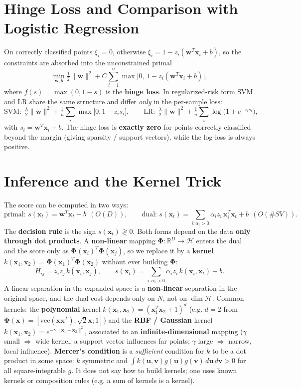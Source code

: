 \section*{Hinge Loss and Comparison with Logistic Regression}

On correctly classified points $\xi_i=0$, otherwise $\xi_i=1-z_i(\mathbf{w}^T\mathbf{x}_i+b)$, so the constraints are absorbed into the unconstrained primal
\[
\min_{\mathbf{w},b}\tfrac12\|\mathbf{w}\|^2+C\sum_{i=1}^n\max\!\big[0,\,1-z_i(\mathbf{w}^T\mathbf{x}_i+b)\big],
\]
where $f(s)=\max(0,1-s)$ is the \textbf{hinge loss}. In regularized-risk form SVM and LR share the same structure and differ \emph{only} in the per-sample loss:
\[
\text{SVM:}\ \ \tfrac{\lambda}{2}\|\mathbf{w}\|^2+\tfrac1n\sum_i\max\!\big[0,1-z_is_i\big],\qquad
\text{LR:}\ \ \tfrac{\lambda}{2}\|\mathbf{w}\|^2+\tfrac1n\sum_i\log\!\big(1+e^{-z_is_i}\big),
\]
with $s_i=\mathbf{w}^T\mathbf{x}_i+b$. The hinge loss is \textbf{exactly zero} for points correctly classified beyond the margin (giving sparsity / support vectors), while the log-loss is always positive.

\section*{Inference and the Kernel Trick}

The score can be computed in two ways:
\[
\text{primal: } s(\mathbf{x}_t)=\mathbf{w}^T\mathbf{x}_t+b\ \ (O(D)),\qquad
\text{dual: } s(\mathbf{x}_t)=\sum_{i:\alpha_i>0}\alpha_iz_i\,\mathbf{x}_i^T\mathbf{x}_t+b\ \ (O(\#SV)).
\]
The \textbf{decision rule} is the sign $s(\mathbf{x}_t)\gtrless0$. Both forms depend on the data \textbf{only through dot products}. A \textbf{non-linear} mapping $\boldsymbol\Phi:\mathbb{R}^D\to\mathcal{H}$ enters the dual and the score only as $\boldsymbol\Phi(\mathbf{x}_i)^T\boldsymbol\Phi(\mathbf{x}_j)$, so we replace it by a \textbf{kernel} $k(\mathbf{x}_1,\mathbf{x}_2)=\boldsymbol\Phi(\mathbf{x}_1)^T\boldsymbol\Phi(\mathbf{x}_2)$ without ever building $\boldsymbol\Phi$:
\[
H_{ij}=z_iz_j\,k(\mathbf{x}_i,\mathbf{x}_j),\qquad s(\mathbf{x}_t)=\sum_{i:\alpha_i>0}\alpha_iz_i\,k(\mathbf{x}_i,\mathbf{x}_t)+b .
\]
A linear separation in the expanded space is a \textbf{non-linear} separation in the original space, and the dual cost depends only on $N$, not on $\dim\mathcal{H}$. Common kernels: the \textbf{polynomial} kernel $k(\mathbf{x}_1,\mathbf{x}_2)=(\mathbf{x}_1^T\mathbf{x}_2+1)^d$ (e.g. $d=2$ from $\boldsymbol\Phi(\mathbf{x})=[\text{vec}(\mathbf{x}\mathbf{x}^T);\sqrt2\mathbf{x};1]$) and the \textbf{RBF / Gaussian} kernel $k(\mathbf{x}_1,\mathbf{x}_2)=e^{-\gamma\|\mathbf{x}_1-\mathbf{x}_2\|^2}$, associated to an \textbf{infinite-dimensional} mapping ($\gamma$ small $\Rightarrow$ wide kernel, a support vector influences far points; $\gamma$ large $\Rightarrow$ narrow, local influence). \textbf{Mercer's condition} is a \emph{sufficient} condition for $k$ to be a dot product in some space: $k$ symmetric and $\int k(\mathbf{u},\mathbf{v})g(\mathbf{u})g(\mathbf{v})\,d\mathbf{u}\,d\mathbf{v}>0$ for all square-integrable $g$. It does not say how to build kernels; one uses known kernels or composition rules (e.g. a sum of kernels is a kernel).

